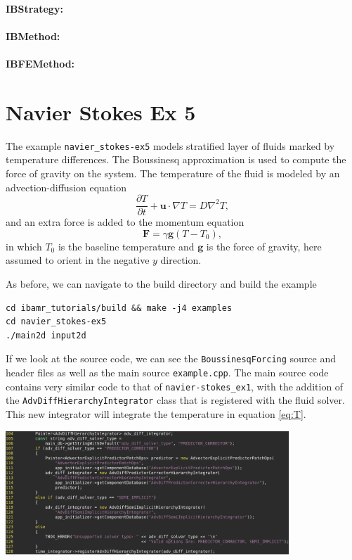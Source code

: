 \documentclass{article}
\newcommand{\bF}{\mathbf{F}}
\newcommand{\bg}{\mathbf{g}}
\newcommand{\bu}{\mathbf{u}}
\newcommand{\grad}{\nabla}
\newcommand{\Lap}{\nabla^2}
\newcommand{\parens}[1]{\mathopen{}\left(#1\right)\mathclose{}}
\begin{document}
\paragraph{IBStrategy:}

\paragraph{IBMethod:}

\paragraph{IBFEMethod:}

\section{Navier Stokes Ex 5}
The example \verb|navier_stokes-ex5| models stratified layer of fluids marked by temperature differences. The Boussinesq approximation is used to compute the force of gravity on the system. The temperature of the fluid is modeled by an advection-diffusion equation
\begin{equation}\label{eq:T}
\frac{\partial T}{\partial t} + \bu\cdot\grad T = D\Lap T,
\end{equation}
and an extra force is added to the momentum equation
\begin{equation}\label{eq:F}
\bF = \gamma\bg\parens{T - T_0},
\end{equation}
in which $T_0$ is the baseline temperature and $\bg$ is the force of gravity, here assumed to orient in the negative $y$ direction.

As before, we can navigate to the build directory and build the example
\begin{verbatim}
cd ibamr_tutorials/build && make -j4 examples
cd navier_stokes-ex5
./main2d input2d
\end{verbatim}
If we look at the source code, we can see the \verb|BoussinesqForcing| source and header files as well as the main source \verb|example.cpp|. The main source code contains very similar code to that of \verb|navier-stokes_ex1|, with the addition of the \verb|AdvDiffHierarchyIntegrator| class that is registered with the fluid solver. This new integrator will integrate the temperature in equation \eqref{eq:T}.
\begin{center}
\includegraphics[width=0.8\textwidth]{Graphs/NS-ex5/source_AdvDiffIntegrator.png}
\end{center}
\end{document}
